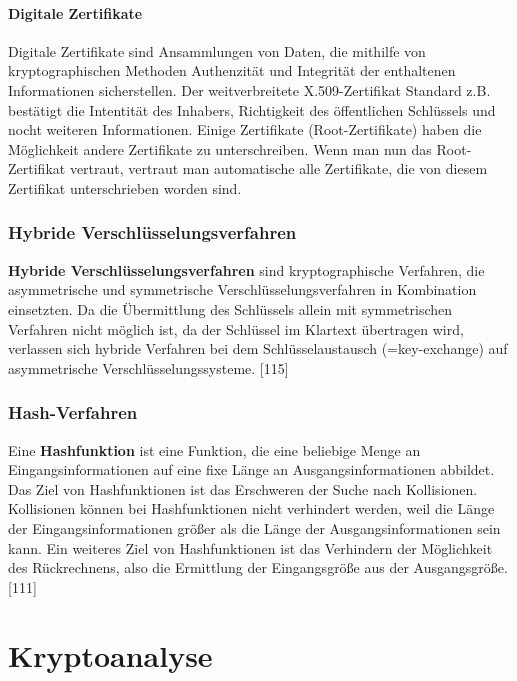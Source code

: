 \documentclass[12pt,a4paper]{report}
\begin{document}
\begin{onehalfspace}
\paragraph{Digitale Zertifikate}

Digitale Zertifikate sind Ansammlungen von Daten, die mithilfe von kryptographischen Methoden Authenzität und Integrität der enthaltenen Informationen sicherstellen. Der weitverbreitete X.509-Zertifikat Standard z.B. bestätigt die Intentität des Inhabers, Richtigkeit des öffentlichen Schlüssels und nocht weiteren Informationen. Einige Zertifikate (Root-Zertifikate) haben die Möglichkeit andere Zertifikate zu unterschreiben. Wenn man nun das Root-Zertifikat vertraut, vertraut man automatische alle Zertifikate, die von diesem Zertifikat unterschrieben worden sind.

\subsubsection{Hybride Verschlüsselungsverfahren}

\textbf{Hybride Verschlüsselungsverfahren} sind kryptographische Verfahren, die asymmetrische und symmetrische Verschlüsselungsverfahren in Kombination einsetzten. Da die Übermittlung des Schlüssels allein mit symmetrischen Verfahren nicht möglich ist, da der Schlüssel im Klartext übertragen wird, verlassen sich hybride Verfahren bei dem Schlüsselaustausch (=key-exchange) auf asymmetrische Verschlüsselungssysteme. [115]

\subsubsection{Hash-Verfahren}

Eine \textbf{Hashfunktion} ist eine Funktion, die eine beliebige Menge an Eingangsinformationen auf eine fixe Länge an Ausgangsinformationen abbildet.  Das Ziel von Hashfunktionen ist das Erschweren der Suche nach Kollisionen. Kollisionen können bei Hashfunktionen nicht verhindert werden, weil die Länge der Eingangsinformationen größer als die Länge der Ausgangsinformationen sein kann. Ein weiteres Ziel von Hashfunktionen ist das Verhindern der Möglichkeit des Rückrechnens, also die Ermittlung der Eingangsgröße aus der Ausgangsgröße.[111]

\newpage
\section{Kryptoanalyse}


\end{onehalfspace}
\end{document}

